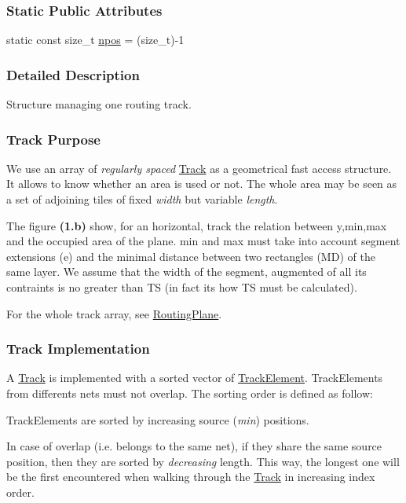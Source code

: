 \subsubsection*{Static Public Attributes}
\begin{DoxyCompactItemize}
\item 
static const size\+\_\+t \hyperlink{classKite_1_1Track_ae0070ea45b2592ce3701ab9e486e58a0}{npos} = (size\+\_\+t)-\/1
\end{DoxyCompactItemize}


\subsubsection{Detailed Description}
Structure managing one routing track. 

\hypertarget{classKite_1_1Track_secTrackPurpose}{}\subsubsection{Track Purpose}\label{classKite_1_1Track_secTrackPurpose}
We use an array of {\itshape regularly spaced} \hyperlink{classKite_1_1Track}{Track} as a geometrical fast access structure. It allows to know whether an area is used or not. The whole area may be seen as a set of adjoining tiles of fixed {\itshape width} but variable {\itshape length}.

The figure {\bfseries (1.\+b)} show, for an horizontal, track the relation between {\ttfamily y,min,max} and the occupied area of the plane. {\ttfamily min} and {\ttfamily max} must take into account segment extensions ({\ttfamily e}) and the minimal distance between two rectangles ({\ttfamily MD}) of the same layer. We assume that the width of the segment, augmented of all it\textquotesingle{}s contraints is no greater than {\ttfamily TS} (in fact it\textquotesingle{}s how {\ttfamily TS} must be calculated).

For the whole track array, see \hyperlink{classKite_1_1RoutingPlane}{Routing\+Plane}.

\hypertarget{classKite_1_1Track_secTrackImplementation}{}\subsubsection{Track Implementation}\label{classKite_1_1Track_secTrackImplementation}
A \hyperlink{classKite_1_1Track}{Track} is implemented with a sorted vector of \hyperlink{classKite_1_1TrackElement}{Track\+Element}. Track\+Elements from differents nets must not overlap. The sorting order is defined as follow\+:
\begin{DoxyItemize}
\item Track\+Elements are sorted by increasing source ({\itshape min}) positions.
\item In case of overlap (i.\+e. belongs to the same net), if they share the same source position, then they are sorted by {\itshape decreasing} length. This way, the longest one will be the first encountered when walking through the \hyperlink{classKite_1_1Track}{Track} in increasing index order.
\end{DoxyItemize}

